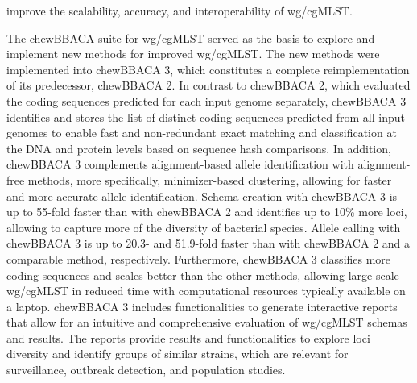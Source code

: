 improve the scalability, accuracy, and interoperability of wg/cgMLST.

The chewBBACA suite for wg/cgMLST served as the basis to explore and implement new methods for improved wg/cgMLST. The new methods were implemented into chewBBACA 3, which constitutes a complete reimplementation of its predecessor, chewBBACA 2. In contrast to chewBBACA 2, which evaluated the coding sequences predicted for each input genome separately, chewBBACA 3 identifies and stores the list of distinct coding sequences predicted from all input genomes to enable fast and non-redundant exact matching and classification at the DNA and protein levels based on sequence hash comparisons. In addition, chewBBACA 3 complements alignment-based allele identification with alignment-free methods, more specifically, minimizer-based clustering, allowing for faster and more accurate allele identification. Schema creation with chewBBACA 3 is up to 55-fold faster than with chewBBACA 2 and identifies up to 10\% more loci, allowing to capture more of the diversity of bacterial species. Allele calling with chewBBACA 3 is up to 20.3- and 51.9-fold faster than with chewBBACA 2 and a comparable method, respectively. Furthermore, chewBBACA 3 classifies more coding sequences and scales better than the other methods, allowing large-scale wg/cgMLST in reduced time with computational resources typically available on a laptop. chewBBACA 3 includes functionalities to generate interactive reports that allow for an intuitive and comprehensive evaluation of wg/cgMLST schemas and results. The reports provide results and functionalities to explore loci diversity and identify groups of similar strains, which are relevant for surveillance, outbreak detection, and population studies.

